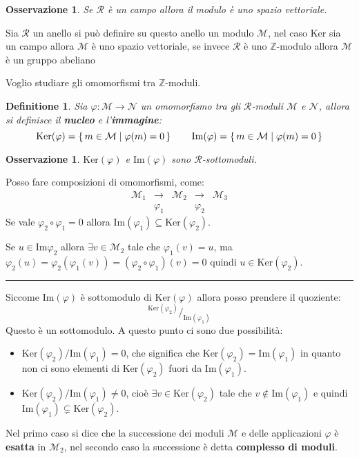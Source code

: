 \documentclass{article}
\newtheorem{osservation}[theorem]{Osservazione}
\newtheorem{definition}[theorem]{Definitione}
\newenvironment{proof}{{\bf Dimostrazione:}}{\hfill\rule{2mm}{2mm}}
\newcommand{\R}{\mathcal{R}}
\newcommand{\M}{\mathcal{M}}
\newcommand{\N}{\mathcal{N}}
\newcommand{\Z}{\mathbb{Z}}
\newcommand{\im}{\mathrm{Im}}
\renewcommand{\ker}{\mathrm{Ker}}
\renewcommand{\phi}{\varphi}
\newcommand*\quot[2]{{^{\textstyle #1}\big/_{\textstyle #2}}}
\begin{document}
\begin{osservation}
  Se $ \R $ è un campo allora il modulo è uno spazio vettoriale.
\end{osservation}

Sia $ \R $ un anello si può definire su questo anello un modulo $ \M $,
nel caso $ \ker $ sia un campo allora $ \M $ è uno spazio vettoriale,
se invece $ \R $ è uno $ \Z $-modulo allora $ \M $ è un gruppo abeliano

Voglio studiare gli omomorfismi tra $ \Z $-moduli.

\begin{definition}
  Sia $ \phi: \M \to \N $ un omomorfismo tra gli $ \R $-moduli $ \M $ e $ \N $,
  allora si definisce il \textbf{nucleo} e l'\textbf{immagine}:
  \[
    \ker (\phi) = \set{ m \in \M | \phi(m) = 0}  \qquad  \im (\phi) = \set{ m \in \M | \phi(m) = 0}
  \]
\end{definition}

\begin{osservation}
  $ \ker (\phi) $ e $ \im (\phi) $ sono $ \R $-sottomoduli.
\end{osservation}

Posso fare composizioni di omomorfismi, come:
\[
  \begin{aligned}
    \M_1 & \longrightarrow & \M_2 & \longrightarrow & \M_3 \\
    & \phi_1 & & \phi_2 &
  \end{aligned}
\]
Se vale $ \phi_2 \circ \phi_1 = 0 $ allora $ \im (\phi_1) \subseteq \ker (\phi_2) $.

\begin{proof}
  Se $ u \in \im {\phi_2} $ allora $ \exists v \in \M_2 $ tale che $ \phi_1(v) = u $,
  ma $ \phi_2(u) = \phi_2(\phi_1(v)) = (\phi_2 \circ \phi_1)(v) = 0 $ quindi $ u \in \ker(\phi_2) $.
\end{proof}

Siccome $ \im (\phi) $ è sottomodulo di $ \ker (\phi) $ allora posso prendere
il quoziente:
\[
  \quot{\ker (\phi_2)}{\im (\phi_1)}
\]
Questo è un sottomodulo.
A questo punto ci sono due possibilità:
\begin{itemize}
\item $ {\ker (\phi_2)} \slash {\im (\phi_1)} = 0 $, che significa che $ \ker (\phi_2) = \im (\phi_1) $ in quanto non ci sono elementi di $ \ker (\phi_2) $ fuori da $ \im (\phi_1) $.
\item $ {\ker (\phi_2)} \slash {\im (\phi_1)} \not= 0 $, cioè $ \exists v \in \ker (\phi_2) $
  tale che $ v \not \in \im (\phi_1) $ e quindi $ \im (\phi_1) \subsetneq \ker (\phi_2) $.
\end{itemize}
Nel primo caso si dice che la successione dei moduli $ \M $ e delle
applicazioni $ \phi $ è \textbf{esatta} in $ \M_2$, nel secondo caso la
successione è detta \textbf{complesso di moduli}.
\end{document}
